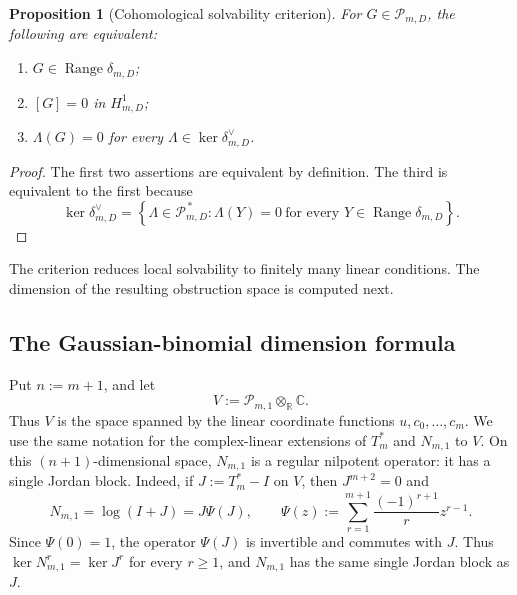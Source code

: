 \documentclass[11pt]{amsart}
\theoremstyle{plain}
\newtheorem{proposition}[theorem]{Proposition}
\theoremstyle{definition}
\theoremstyle{remark}
\numberwithin{equation}{section}
\theoremstyle{plain}
\begin{document}
\begin{proposition}[Cohomological solvability criterion]
	\label{prop:cohomological-test}
	For $G\in\mathscr P_{m,D}$, the following are equivalent:
	\begin{enumerate}[label=\textup{(\roman*)}]
		\item $G\in\operatorname{Range}\delta_{m,D}$;
		\item $[G]=0$ in $H^1_{m,D}$;
		\item $\Lambda(G)=0$ for every
		$\Lambda\in\ker\delta_{m,D}^{\vee}$.
	\end{enumerate}
\end{proposition}

\begin{proof}
	The first two assertions are equivalent by definition.  The third is
	equivalent to the first because
	\[
	\ker\delta_{m,D}^{\vee}
	=\left\{
	\Lambda\in\mathscr P_{m,D}^{\,*}:
	\Lambda(Y)=0\ \text{for every }
	Y\in\operatorname{Range}\delta_{m,D}
	\right\}.
	\]
\end{proof}

The criterion reduces local solvability to finitely many linear
conditions.  The dimension of the resulting obstruction space is computed
next.

\subsection{The Gaussian-binomial dimension formula}
\label{sec:gaussian-dimension}

Put $n:=m+1$, and let
\[
V:=\mathscr P_{m,1}\otimes_{\mathbb R}\mathbb C.
\]
Thus $V$ is the space spanned by the linear coordinate functions
$u,c_0,\ldots,c_m$.  We use the same notation for the complex-linear
extensions of $T_m^*$ and $N_{m,1}$ to $V$.  On this
$(n+1)$-dimensional space,
$N_{m,1}$ is a regular nilpotent operator: it has a single Jordan block.
Indeed, if $J:=T_m^*-I$ on $V$, then
$J^{m+2}=0$ and
\[
N_{m,1}=\log(I+J)=J\Psi(J),
\qquad
\Psi(z):=\sum_{r=1}^{m+1}\frac{(-1)^{r+1}}{r}z^{r-1}.
\]
Since $\Psi(0)=1$, the operator $\Psi(J)$ is invertible and commutes with
$J$.  Thus $\ker N_{m,1}^r=\ker J^r$ for every $r\ge1$, and
$N_{m,1}$ has the same single Jordan block as $J$.
\end{document}
